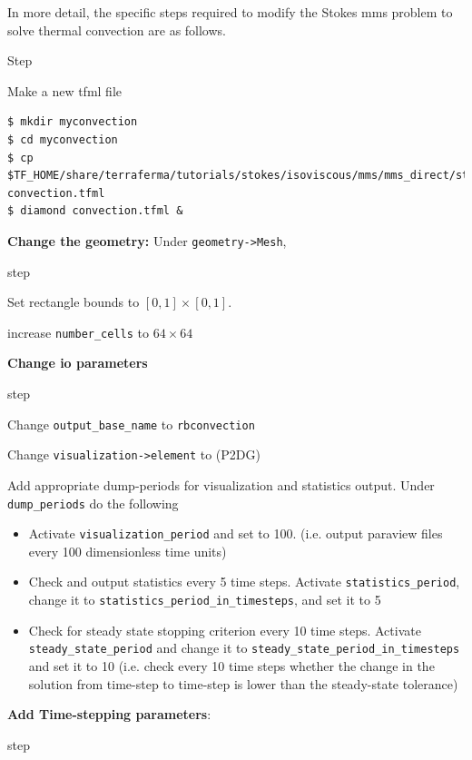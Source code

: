 In more detail, the specific steps required to modify the Stokes mms
problem to solve thermal convection are as follows.
\begin{steps}{Step}
\item Make a new tfml file
  \begin{lstlisting}[style=Bash]
$ mkdir myconvection
$ cd myconvection
$ cp $TF_HOME/share/terraferma/tutorials/stokes/isoviscous/mms/mms_direct/stokes.tfml convection.tfml
$ diamond convection.tfml &
  \end{lstlisting}%
\item \textbf{Change the geometry:} Under \texttt{geometry->Mesh},
  \begin{steps}{step}

  \item Set rectangle bounds to  $[0,1]\times[0,1]$. 
  \item increase \texttt{number\_cells} to $64\times64$
  \end{steps}
\item \textbf{Change io parameters}
  \begin{steps}{step}
  \item Change \texttt{output\_base\_name} to \texttt{rbconvection}
  \item Change \texttt{visualization->element} to (P2DG)
  \item Add appropriate dump-periods for visualization and statistics
    output.  Under \texttt{dump\_periods} do the following
    \begin{itemize}
    \item Activate \texttt{visualization\_period} and set to
      100. (i.e. output paraview files every 100 dimensionless time units)
    \item Check and output statistics every 5 time steps. Activate
      \texttt{statistics\_period}, change it to
      \texttt{statistics\_period\_in\_timesteps}, and set it to 5
    \item Check for steady state stopping criterion every 10 time
      steps. Activate \texttt{steady\_state\_period} and change it to
      \texttt{steady\_state\_period\_in\_timesteps} and set it to 10
      (i.e. check every 10 time steps  whether the change in the solution from   time-step to time-step is lower than the steady-state tolerance)
    \end{itemize}
  \end{steps}
\item \textbf{Add Time-stepping parameters}:
  \begin{steps}{step}

\end{steps}
\end{steps}
